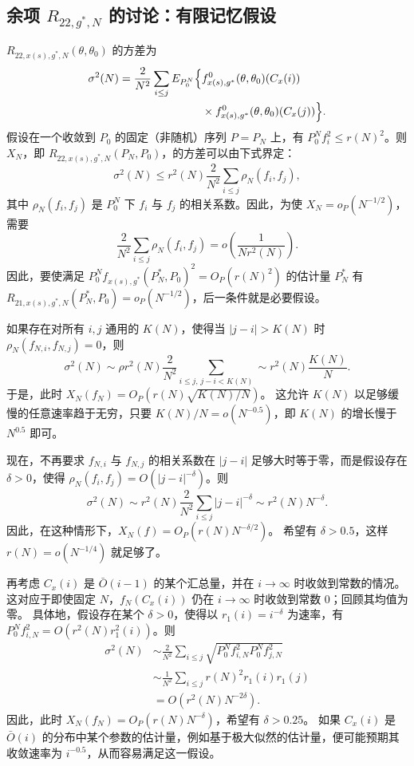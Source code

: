 
\subsection{余项 \texorpdfstring{$R_{22,g^*,N}$}{R22,g*,N} 的讨论：有限记忆假设}

$R_{22,x(s),g^*,N}(\theta,\theta_0)$ 的方差为
\[
\begin{aligned}
\sigma^2(N)=\frac2{N^2}\sum_{i\le j}E_{P_0^N}\Bigl\{
&f^0_{x(s),g^*}(\theta,\theta_0)(C_x(i))\\
&\times f^0_{x(s),g^*}(\theta,\theta_0)(C_x(j))\Bigr\}.
\end{aligned}
\]
假设在一个收敛到 $P_0$ 的固定（非随机）序列 $P=P_N$ 上，有
$P_0^Nf_i^2\le r(N)^2$。则 $X_N$，即
$R_{22,x(s),g^*,N}(P_N,P_0)$，的方差可以由下式界定：
\[
\sigma^2(N)\le r^2(N)\frac2{N^2}\sum_{i\le j}\rho_N(f_i,f_j),
\]
其中 $\rho_N(f_i,f_j)$ 是 $P_0^N$ 下 $f_i$ 与 $f_j$ 的相关系数。因此，为使
$X_N=o_P(N^{-1/2})$，需要
\[
\frac2{N^2}\sum_{i\le j}\rho_N(f_i,f_j)
 =o\left(\frac1{Nr^2(N)}\right).
\]
因此，要使满足 $P_0^Nf_{x(s),g^*}(P_N^*,P_0)^2=O_P(r(N)^2)$ 的估计量 $P_N^*$ 有
$R_{21,x(s),g^*,N}(P_N^*,P_0)=o_P(N^{-1/2})$，后一条件就是必要假设。

如果存在对所有 $i,j$ 通用的 $K(N)$，使得当 $|j-i|>K(N)$ 时
$\rho_N(f_{N,i},f_{N,j})=0$，则
\[
\sigma^2(N)\sim\rho r^2(N)\frac2{N^2}
 \sum_{i\le j,\,j-i<K(N)}
 \sim r^2(N)\frac{K(N)}N.
\]
于是，此时 $X_N(f_N)=O_P(r(N)\sqrt{K(N)/N})$。
这允许 $K(N)$ 以足够缓慢的任意速率趋于无穷，只要
$K(N)/N=o(N^{-0.5})$，即 $K(N)$ 的增长慢于 $N^{0.5}$ 即可。

现在，不再要求 $f_{N,i}$ 与 $f_{N,j}$ 的相关系数在 $|j-i|$ 足够大时等于零，而是假设存在 $\delta>0$，使得
$\rho_N(f_i,f_j)=O(|j-i|^{-\delta})$。则
\[
\sigma^2(N)\sim r^2(N)\frac2{N^2}\sum_{i\le j}|j-i|^{-\delta}
 \sim r^2(N)N^{-\delta}.
\]
因此，在这种情形下，$X_N(f)=O_P(r(N)N^{-\delta/2})$。
希望有 $\delta>0.5$，这样 $r(N)=o(N^{-1/4})$ 就足够了。

再考虑 $C_x(i)$ 是 $\bar O(i-1)$ 的某个汇总量，并在 $i\to\infty$ 时收敛到常数的情况。
这对应于即使固定 $N$，$f_N(C_x(i))$ 仍在 $i\to\infty$ 时收敛到常数 0；回顾其均值为零。
具体地，假设存在某个 $\delta>0$，使得以 $r_1(i)=i^{-\delta}$ 为速率，有
$P_0^Nf_{i,N}^2=O(r^2(N)r_1^2(i))$。则
\[
\begin{aligned}
\sigma^2(N)
&\sim\frac2{N^2}\sum_{i\le j}
 \sqrt{P_0^Nf_{i,N}^2P_0^Nf_{j,N}^2}\\
&\sim\frac1{N^2}\sum_{i\le j}r(N)^2r_1(i)r_1(j)\\
&=O(r^2(N)N^{-2\delta}).
\end{aligned}
\]
因此，此时 $X_N(f_N)=O_P(r(N)N^{-\delta})$，希望有 $\delta>0.25$。
如果 $C_x(i)$ 是 $\bar O(i)$ 的分布中某个参数的估计量，例如基于极大似然的估计量，便可能预期其收敛速率为 $i^{-0.5}$，从而容易满足这一假设。

